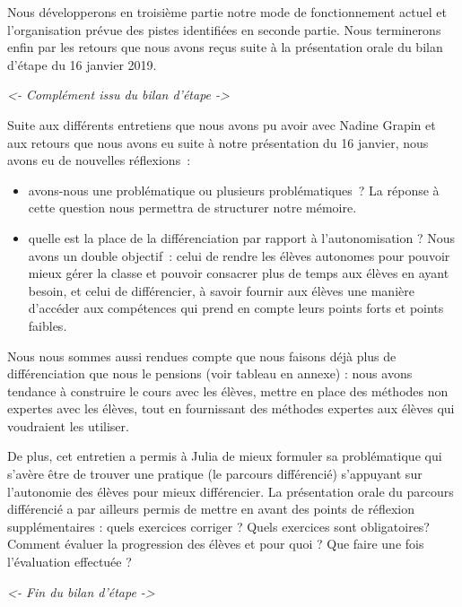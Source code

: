 Nous développerons en troisième partie notre mode de fonctionnement actuel et l’organisation prévue des pistes identifiées en seconde partie.
Nous terminerons enfin par les retours que nous avons reçus suite à la présentation orale du bilan d’étape du 16 janvier 2019. 

\textit{<- Complément issu du bilan d'étape ->}

Suite aux différents entretiens que nous avons pu avoir avec Nadine Grapin et aux retours que nous avons eu suite à notre présentation du 16 janvier, nous avons eu de nouvelles réflexions : 
\begin{itemize}
    \item avons-nous une problématique ou plusieurs problématiques ? La réponse à cette question nous permettra de structurer notre mémoire.
    \item quelle est la place de la différenciation par rapport à l’autonomisation ? Nous avons un double objectif : celui de rendre les élèves autonomes pour pouvoir mieux gérer la classe et pouvoir consacrer plus de temps aux élèves en ayant besoin, et celui de différencier, à savoir fournir aux élèves une manière d’accéder aux compétences qui prend en compte leurs points forts et points faibles.
\end{itemize}
    
Nous nous sommes aussi rendues compte que nous faisons déjà plus de différenciation que nous le pensions (voir tableau en annexe) : nous avons tendance à construire le cours avec les élèves, mettre en place des méthodes non expertes avec les élèves, tout en fournissant des méthodes expertes aux élèves qui voudraient les utiliser.

De plus, cet entretien a permis à Julia de mieux formuler sa problématique qui s’avère être de trouver une pratique (le parcours différencié) s’appuyant sur l’autonomie des élèves pour mieux différencier. La présentation orale du parcours différencié a par ailleurs permis de mettre en avant des points de réflexion supplémentaires : quels exercices corriger ? Quels exercices sont obligatoires? Comment évaluer la progression des élèves et pour quoi ? Que faire une fois l’évaluation effectuée ?

\textit{<- Fin du bilan d'étape ->}